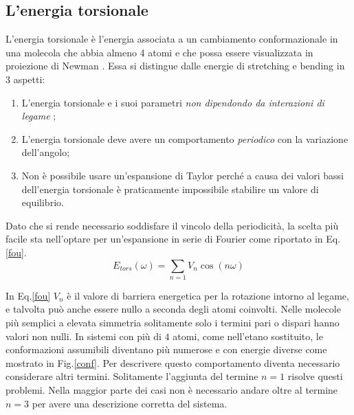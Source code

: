 \documentclass[oneside]{amsbook}
\numberwithin{section}{chapter}
\numberwithin{equation}{section}
\numberwithin{figure}{section}
\begin{document}
\subsection{L'energia torsionale }
L'energia torsionale è l'energia associata a un cambiamento conformazionale  in una molecola che abbia almeno 4 atomi e che possa essere visualizzata in proiezione di Newman .
Essa si distingue dalle energie di stretching e bending in $3$ aspetti:
\begin{enumerate}
\item L'energia torsionale e i suoi parametri \emph{non dipendondo da interazioni di legame };
\item L'energia torsionale deve avere un comportamento \emph{periodico} con la variazione dell'angolo;
\item Non è possibile usare un'espansione di Taylor perché a causa dei valori bassi dell'energia torsionale è praticamente impossibile stabilire un valore di equilibrio.
\end{enumerate}

Dato che si rende necessario soddisfare il vincolo della periodicità, la scelta più facile sta nell'optare per un'espansione in serie di Fourier  come riportato in Eq.\ref{fou}.
\begin{equation}
\label{fou}
E_{tors}(\omega)=\sum \limits _{n=1} V_n \cos (n\omega)
\end{equation}

In Eq.\ref{fou} $V_n$ è il valore di barriera energetica per la rotazione intorno al legame, e talvolta può anche essere nullo a seconda degli atomi coinvolti. Nelle molecole più semplici a elevata simmetria solitamente solo i termini pari o dispari hanno valori non nulli.
In sistemi con più di $4$ atomi, come nell'etano sostituito, le conformazioni assumibili diventano più numerose e con energie diverse come mostrato in Fig.\ref{conf}. Per descrivere questo comportamento diventa necessario considerare altri termini. Solitamente l'aggiunta del termine $n=1$ risolve questi problemi.
Nella maggior parte dei casi non è necessario andare oltre al termine $n=3$ per avere una descrizione corretta del sistema.
\end{document}

